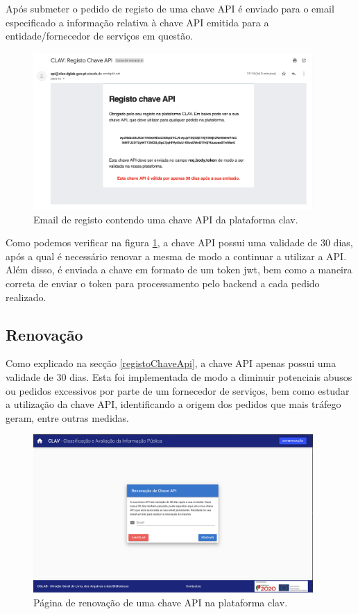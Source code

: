 Após submeter o pedido de registo de uma chave API é enviado para o email especificado a informação relativa à chave API emitida para a entidade/fornecedor de serviços em questão.

\begin{figure}[H]
    \centering
    \includegraphics[width=0.95\textwidth]{img/clav/authAPI/emailRegisto.png}
    \caption{Email de registo contendo uma chave API da plataforma \gls{clav}.}
    \label{fig:emailRegistoChaveApi}
\end{figure}

Como podemos verificar na figura \ref{fig:emailRegistoChaveApi}, a chave API possui uma validade de 30 dias, após a qual é necessário renovar a mesma de modo a continuar a utilizar a API. Além disso, é enviada a chave em formato de um token \gls{jwt}, bem como a maneira correta de enviar o token para processamento pelo backend a cada pedido realizado.

\subsection{Renovação}

Como explicado na secção \ref{registoChaveApi}, a chave API apenas possui uma validade de 30 dias. Esta foi implementada de modo a diminuir potenciais abusos ou pedidos excessivos por parte de um fornecedor de serviços, bem como estudar a utilização da chave API, identificando a origem dos pedidos que mais tráfego geram, entre outras medidas.

\begin{figure}[H]
    \centering
    \includegraphics[width=0.95\textwidth]{img/clav/authAPI/renovar.png}
    \caption{Página de renovação de uma chave API na plataforma \gls{clav}.}
    \label{fig:renovarChaveAPI}
\end{figure}

